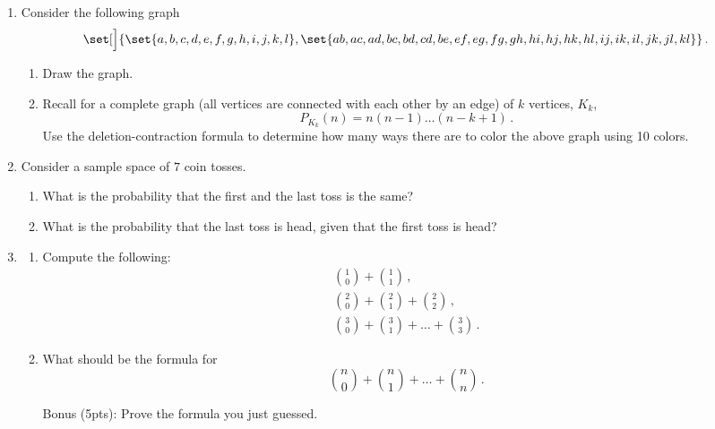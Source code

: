 \documentclass[12pt]{amsart}
\begin{document}
\begin{enumerate}[label=\arabic*.,itemsep=10pt, leftmargin=*]
    \item
    Consider the following graph
   \begin{equation*}
       \set[\Big]{\set{a,b,c,d,e,f,g,h,i,j,k,l}, \set{ab,ac,ad,bc,bd,cd,be,ef,eg,fg,gh,hi,hj,hk,hl,ij,ik,il,jk,jl,kl}}\,.
   \end{equation*}
   \begin{enumerate}
    \item Draw the graph. 
    \item Recall for a complete graph (all vertices are connected with each other by an edge) of $k$ vertices, $K_k$, $$P_{K_k}(n) = n(n-1)\dots(n-k+1)\,.$$ 
    Use the deletion-contraction formula to determine how many ways there are to color the above graph using 10 colors.
    \end{enumerate}
    \item 
        Consider a sample space of $7$ coin tosses.
        \begin{enumerate}
            \item What is the probability that the first and the last toss is the same?
            \item What is the probability that the last toss is head, given that the
                first toss is head?
        \end{enumerate}


    \item 
        \begin{enumerate}
            \item Compute the following:
                \begin{gather*}
                    \binom{1}{0} + \binom{1}{1} \,, \\
                    \binom{2}{0} + \binom{2}{1} + \binom{2}{2} \,, \\
                    \binom{3}{0} + \binom{3}{1} + \dots + \binom{3}{3} \,.
                \end{gather*}
    \item
        What should be the formula for 
        \begin{equation*}
            \binom{n}{0} + \binom{n}{1} + \dots + \binom{n}{n} \,.
        \end{equation*}

    \item[Bonus (5pts):] Prove the formula you just guessed.
        \end{enumerate}


\end{enumerate}
\end{document}
